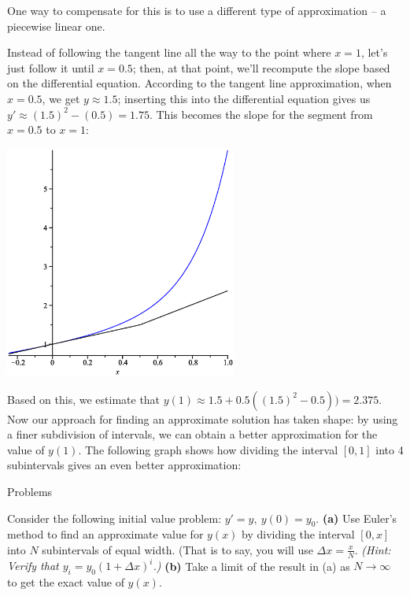\documentclass[12pt,letterpaper,twoside]{amsart}
\newcounter{example}
\newcounter{problem}
\newcommand{\problem}{\bigskip \noindent {\large {\sc Problem \arabic{problem}:}} \addtocounter{problem}{1}}
\begin{document}
One way to compensate for this is to use a different type of approximation -- a piecewise linear one.

Instead of following the tangent line all the way to the point where $x=1$, let's just follow it until $x=0.5$; then, at that point, we'll recompute the slope based on the differential equation.  According to the tangent line approximation, when $x=0.5$, we get $y \approx 1.5$; inserting this into the differential equation gives us $y' \approx (1.5)^2-(0.5)=1.75.$  This becomes the slope for the segment from $x=0.5$ to $x=1$:
\begin{center}
\includegraphics[width=3in]{example2.eps}
\end{center}
Based on this, we estimate that $y(1) \approx 1.5+0.5((1.5)^2-0.5))=2.375$.  Now our approach for finding an approximate solution has taken shape: by using a finer subdivision of intervals, we can obtain a better approximation for the value of $y(1)$.  The following graph shows how dividing the interval $[0,1]$ into 4 subintervals gives an even better approximation:






\begin{center} {\LARGE Problems} \end{center}

\setcounter{problem}{1}

\problem Consider the following initial value problem: $y'=y, \ y(0)=y_0$.  {\bf (a)} Use Euler's method to find an approximate value for $y(x)$ by dividing the interval $[0,x]$ into $N$ subintervals of equal width.  (That is to say, you will use $\Delta x = \frac{x}{N}$.  {\it (Hint: Verify that $y_i=y_0(1+\Delta x)^i$.)}  {\bf (b)} Take a limit of the result in (a) as $N \rightarrow \infty$ to get the exact value of $y(x)$.
\end{document}
